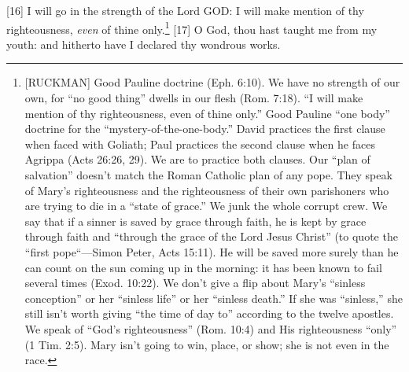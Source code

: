 [16] \textcolor[rgb]{0.00,0.00,1.00}{I will go in the strength of the Lord GOD: I will make mention of thy righteousness, \emph{even} of thine only.}\footnote{[RUCKMAN] Good Pauline doctrine (Eph. 6:10). We have no strength of our own, for “no good thing” dwells in our flesh (Rom. 7:18). “I will make mention of thy righteousness, even of thine only.” Good Pauline “one body” doctrine for the “mystery-of-the-one-body.” David practices the first clause when faced with Goliath; Paul practices the second clause when he faces Agrippa (Acts 26:26, 29). We are to practice both clauses. Our “plan of salvation” doesn’t match the Roman Catholic plan of any pope. They speak of Mary’s righteousness and the righteousness of their own parishoners who are trying to die in a “state of grace.” We junk the whole corrupt crew. We say that if a sinner is saved by grace through faith, he is kept by grace through faith and “through the grace of the Lord Jesus Christ” (to quote the “first pope“—Simon Peter, Acts 15:11). He will be saved more surely than he can count on the sun coming up in the morning: it has been known to fail several times (Exod. 10:22). We don’t give a flip about Mary’s “sinless conception” or her “sinless life” or her “sinless death.” If she was “sinless,” she still isn’t worth giving “the time of day to” according to the twelve apostles. We speak of “God’s righteousness” (Rom. 10:4) and His righteousness “only” (1 Tim. 2:5). Mary isn’t going to win, place, or show; she is not even in the race.\cite{Ruckman1992Psalms}}
[17] \textcolor[rgb]{0.00,0.00,1.00}{O God, thou hast taught me from my youth: and hitherto have I declared thy wondrous works.}
